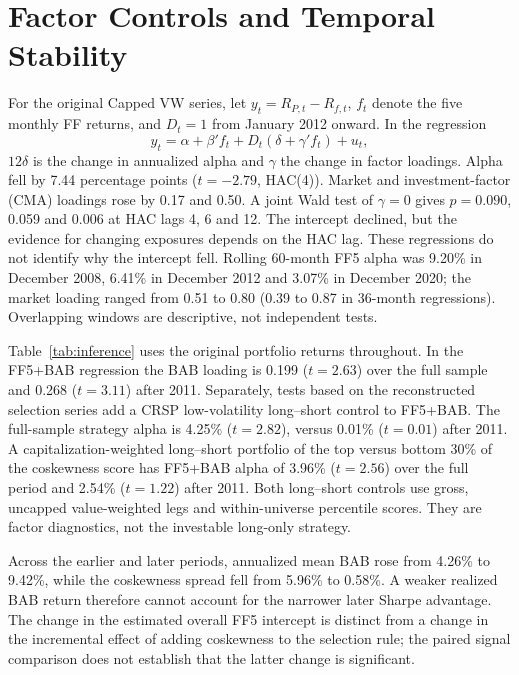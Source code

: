 \documentclass[letterpaper,journal]{IEEEtran}
\begin{document}
\section{Factor Controls and Temporal Stability}\label{app:temporal}
For the original Capped VW series, let $y_t=R_{P,t}-R_{f,t}$, $f_t$ denote the five monthly FF returns, and $D_t=1$ from January 2012 onward. In the regression
\begin{equation}
 y_t=\alpha+\beta'f_t+D_t(\delta+\gamma'f_t)+u_t,
\end{equation}
$12\delta$ is the change in annualized alpha and $\gamma$ the change in factor loadings. Alpha fell by 7.44 percentage points ($t=-2.79$, HAC(4)). Market and investment-factor (CMA) loadings rose by 0.17 and 0.50. A joint Wald test of $\gamma=0$ gives $p=0.090$, 0.059 and 0.006 at HAC lags 4, 6 and 12. The intercept declined, but the evidence for changing exposures depends on the HAC lag. These regressions do not identify why the intercept fell. Rolling 60-month FF5 alpha was 9.20\% in December 2008, 6.41\% in December 2012 and 3.07\% in December 2020; the market loading ranged from 0.51 to 0.80 (0.39 to 0.87 in 36-month regressions). Overlapping windows are descriptive, not independent tests.

Table~\ref{tab:inference} uses the original portfolio returns throughout. In the FF5+BAB regression the BAB loading is 0.199 ($t=2.63$) over the full sample and 0.268 ($t=3.11$) after 2011. Separately, tests based on the reconstructed selection series add a CRSP low-volatility long--short control to FF5+BAB. The full-sample strategy alpha is 4.25\% ($t=2.82$), versus 0.01\% ($t=0.01$) after 2011. A capitalization-weighted long--short portfolio of the top versus bottom 30\% of the coskewness score has FF5+BAB alpha of 3.96\% ($t=2.56$) over the full period and 2.54\% ($t=1.22$) after 2011. Both long--short controls use gross, uncapped value-weighted legs and within-universe percentile scores. They are factor diagnostics, not the investable long-only strategy.

Across the earlier and later periods, annualized mean BAB rose from 4.26\% to 9.42\%, while the coskewness spread fell from 5.96\% to 0.58\%. A weaker realized BAB return therefore cannot account for the narrower later Sharpe advantage. The change in the estimated overall FF5 intercept is distinct from a change in the incremental effect of adding coskewness to the selection rule; the paired signal comparison does not establish that the latter change is significant.
\end{document}
